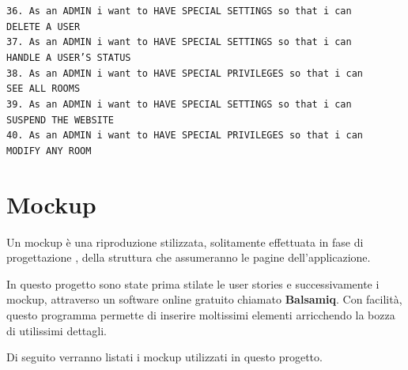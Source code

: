 	\texttt{36. As an ADMIN i want to HAVE SPECIAL SETTINGS so that i can\\ DELETE A USER}\\
	\texttt{37. As an ADMIN i want to HAVE SPECIAL SETTINGS so that i can\\ HANDLE A USER’S STATUS}\\
	\texttt{38. As an ADMIN i want to HAVE SPECIAL PRIVILEGES so that i can\\ SEE ALL ROOMS}\\
	\texttt{39. As an ADMIN i want to HAVE SPECIAL SETTINGS so that i can \\SUSPEND THE WEBSITE}\\
	\texttt{40. As an ADMIN i want to HAVE SPECIAL PRIVILEGES so that i can \\MODIFY ANY ROOM}
	
	\section{Mockup}
	Un mockup è una riproduzione stilizzata, solitamente effettuata in fase di progettazione , della struttura che assumeranno le pagine dell'applicazione.
	
	In questo progetto sono state prima stilate le user stories e successivamente i mockup, attraverso un software online gratuito chiamato \textbf{Balsamiq}. Con facilità, questo programma permette di inserire moltissimi elementi arricchendo la bozza di utilissimi dettagli.
	
	Di seguito verranno listati i mockup utilizzati in questo progetto.
	
